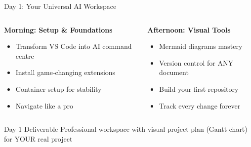 \documentclass{beamer}
\begin{document}
\begin{frame}{Day 1: Your Universal AI Workspace}
\begin{columns}[T]
\begin{column}{0.5\textwidth}
\textbf{Morning: Setup \& Foundations}
\begin{itemize}
\item Transform VS Code into AI command centre
\item Install game-changing extensions
\item Container setup for stability
\item Navigate like a pro
\end{itemize}
\end{column}
\begin{column}{0.5\textwidth}
\textbf{Afternoon: Visual Tools}
\begin{itemize}
\item Mermaid diagrams mastery
\item Version control for ANY document
\item Build your first repository
\item Track every change forever
\end{itemize}
\end{column}
\end{columns}
\vspace{0.5em}
\begin{alertblock}{Day 1 Deliverable}
Professional workspace with visual project plan (Gantt chart) for YOUR real project
\end{alertblock}
\end{frame}
\end{document}
